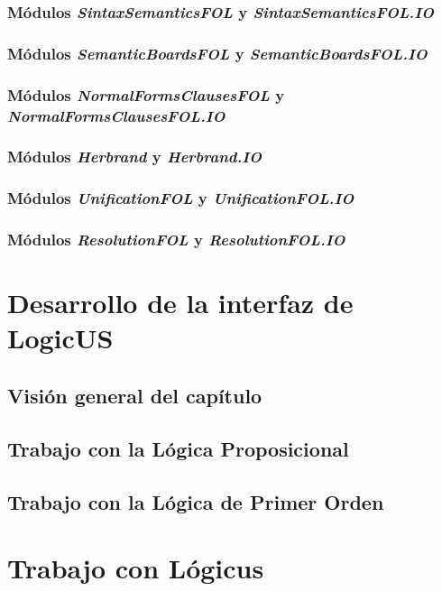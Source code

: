\documentclass[fleqn, 11pt, a4paper]{book}
\begin{document}
\subsection{Módulos \textit{SintaxSemanticsFOL} y \textit{SintaxSemanticsFOL.IO}}
\subsection{Módulos \textit{SemanticBoardsFOL} y \textit{SemanticBoardsFOL.IO}}
\subsection{Módulos \textit{NormalFormsClausesFOL} y \textit{NormalFormsClausesFOL.IO}}
\subsection{Módulos \textit{Herbrand} y \textit{Herbrand.IO}}
\subsection{Módulos \textit{UnificationFOL} y \textit{UnificationFOL.IO}}
\subsection{Módulos \textit{ResolutionFOL} y \textit{ResolutionFOL.IO}}



\chapter{Desarrollo de la interfaz de LogicUS}

\minitoc

\newpage

\section{Visión general del capítulo}

\section{Trabajo con la Lógica Proposicional}

\section{Trabajo con la Lógica de Primer Orden}

\chapter{Trabajo con Lógicus}
\end{document}
